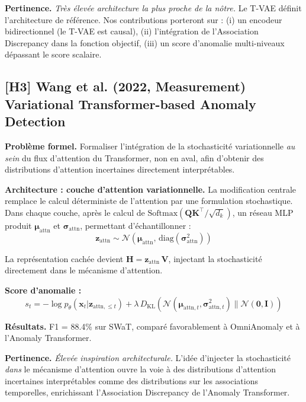 \documentclass[12pt,a4paper]{article}
\begin{document}
\textbf{Pertinence.} \textit{Très élevée  architecture la plus proche de la nôtre.} Le T-VAE définit l'architecture de référence. Nos contributions porteront sur : (i) un encodeur bidirectionnel (le T-VAE est causal), (ii) l'intégration de l'Association Discrepancy dans la fonction objectif, (iii) un score d'anomalie multi-niveaux dépassant le score scalaire.

\subsection{[H3] Wang et al. (2022, Measurement)  Variational Transformer-based Anomaly Detection}

\textbf{Problème formel.} Formaliser l'intégration de la stochasticité variationnelle \textit{au sein} du flux d'attention du Transformer, non en aval, afin d'obtenir des distributions d'attention incertaines directement interprétables.

\textbf{Architecture : couche d'attention variationnelle.} La modification centrale remplace le calcul déterministe de l'attention par une formulation stochastique. Dans chaque couche, après le calcul de $\mathrm{Softmax}(\mathbf{QK}^\top/\sqrt{d_k})$, un réseau MLP produit $\boldsymbol{\mu}_{\mathrm{attn}}$ et $\boldsymbol{\sigma}_{\mathrm{attn}}$, permettant d'échantillonner :
$$\mathbf{z}_{\mathrm{attn}} \sim \mathcal{N}(\boldsymbol{\mu}_{\mathrm{attn}},\,\mathrm{diag}(\boldsymbol{\sigma}^2_{\mathrm{attn}}))$$

La représentation cachée devient $\mathbf{H} = \mathbf{z}_{\mathrm{attn}}\,\mathbf{V}$, injectant la stochasticité directement dans le mécanisme d'attention.

\textbf{Score d'anomalie :}
$$s_t = -\log p_\theta(\mathbf{x}_t|\mathbf{z}_{\mathrm{attn},\leq t}) + \lambda\,D_{\mathrm{KL}}(\mathcal{N}(\boldsymbol{\mu}_{\mathrm{attn},t},\boldsymbol{\sigma}^2_{\mathrm{attn},t})\|\mathcal{N}(\mathbf{0},\mathbf{I}))$$

\textbf{Résultats.} F1 = 88.4\% sur SWaT, comparé favorablement à OmniAnomaly et à l'Anomaly Transformer.

\textbf{Pertinence.} \textit{Élevée  inspiration architecturale.} L'idée d'injecter la stochasticité \textit{dans} le mécanisme d'attention ouvre la voie à des distributions d'attention incertaines interprétables comme des distributions sur les associations temporelles, enrichissant l'Association Discrepancy de l'Anomaly Transformer.
\end{document}
